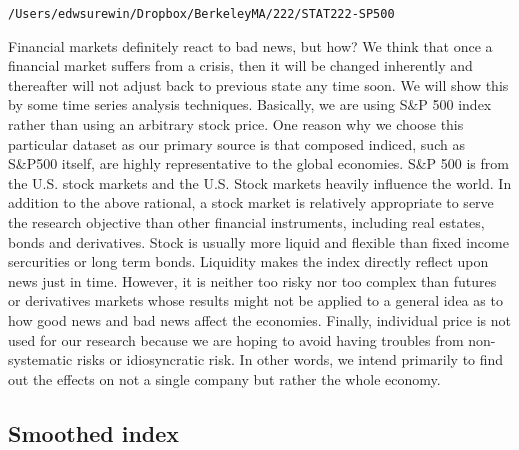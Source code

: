 \documentclass[letterpaper,10pt,english]{/Users/edwsurewin/anaconda/lib/python2.7/site-packages/sphinx/texinputs/sphinxhowto}
\newenvironment{InvisibleVerbatim}
        {\begin{mdframed}[leftmargin=0.1\linewidth,innerleftmargin=3pt,innerrightmargin=3pt, userdefinedwidth=1\linewidth, linewidth=0pt, linecolor=white, usetwoside=false]}
        {\end{mdframed}}
\begin{document}
        

            
                \begin{InvisibleVerbatim}
                \vspace{-0.5\baselineskip}
\begin{alltt}/Users/edwsurewin/Dropbox/Berkeley MA/222/STAT222-SP500
\end{alltt}

            \end{InvisibleVerbatim}
            
        
    
Financial markets definitely react to bad news, but how? We think that
once a financial market suffers from a crisis, then it will be changed
inherently and thereafter will not adjust back to previous state any
time soon. We will show this by some time series analysis techniques.
Basically, we are using S\&P 500 index rather than using an arbitrary
stock price. One reason why we choose this particular dataset as our
primary source is that composed indiced, such as S\&P500 itself, are
highly representative to the global economies. S\&P 500 is from the U.S.
stock markets and the U.S. Stock markets heavily influence the world. In
addition to the above rational, a stock market is relatively appropriate
to serve the research objective than other financial instruments,
including real estates, bonds and derivatives. Stock is usually more
liquid and flexible than fixed income sercurities or long term bonds.
Liquidity makes the index directly reflect upon news just in time.
However, it is neither too risky nor too complex than futures or
derivatives markets whose results might not be applied to a general idea
as to how good news and bad news affect the economies. Finally,
individual price is not used for our research because we are hoping to
avoid having troubles from non-systematic risks or idiosyncratic risk.
In other words, we intend primarily to find out the effects on not a
single company but rather the whole economy.\subsection{Smoothed index}\label{smoothed-index}

\iffalse

\end{document}
